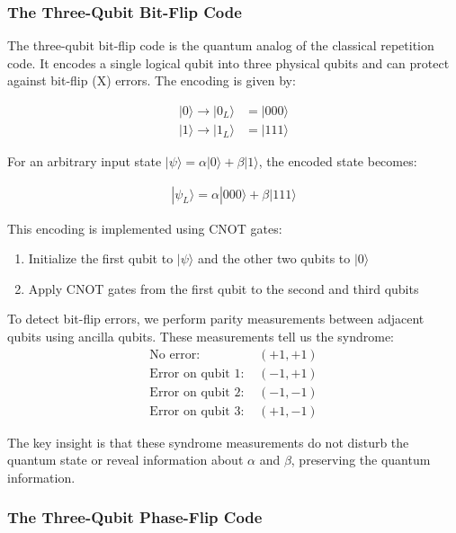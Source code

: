 \documentclass[12pt,a4paper]{article}
\begin{document}
\subsubsection{The Three-Qubit Bit-Flip Code}

The three-qubit bit-flip code is the quantum analog of the classical repetition code. It encodes a single logical qubit into three physical qubits and can protect against bit-flip (X) errors. The encoding is given by:

\begin{align}
|0\rangle \rightarrow |0_L\rangle &= |000\rangle\\
|1\rangle \rightarrow |1_L\rangle &= |111\rangle
\end{align}

For an arbitrary input state $|\psi\rangle = \alpha|0\rangle + \beta|1\rangle$, the encoded state becomes:

\begin{align}
|\psi_L\rangle = \alpha|000\rangle + \beta|111\rangle
\end{align}

This encoding is implemented using CNOT gates:
\begin{enumerate}
    \item Initialize the first qubit to $|\psi\rangle$ and the other two qubits to $|0\rangle$
    \item Apply CNOT gates from the first qubit to the second and third qubits
\end{enumerate}

To detect bit-flip errors, we perform parity measurements between adjacent qubits using ancilla qubits. These measurements tell us the syndrome:
\begin{align}
\text{No error: } &(+1, +1) \\
\text{Error on qubit 1: } &(-1, +1) \\
\text{Error on qubit 2: } &(-1, -1) \\
\text{Error on qubit 3: } &(+1, -1)
\end{align}

The key insight is that these syndrome measurements do not disturb the quantum state or reveal information about $\alpha$ and $\beta$, preserving the quantum information.

\subsubsection{The Three-Qubit Phase-Flip Code}
\end{document}

